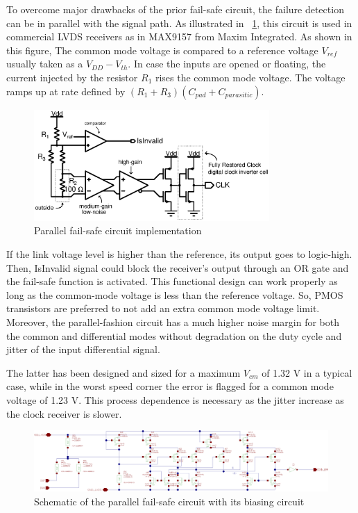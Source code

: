 To overcome major drawbacks of the prior fail-safe circuit, the failure detection can be in parallel with the signal path. As illustrated in \figurename~\ref{fig:parallel-fail-safe}, this circuit is used in commercial LVDS receivers as in MAX9157 from Maxim Integrated. As shown in this figure, The common mode voltage is compared to a reference voltage $V_{ref}$ usually taken as a $V_{DD}-V_{th}$. In case the inputs are opened or floating, the current injected by the resistor $R_1$ rises the common mode voltage. The voltage ramps up at rate defined by $(R_1+R_3)(C_{pad}+C_{parasitic})$.

\begin{figure}[htp]
    \centering
    \includegraphics[width=0.8\textwidth]{Chapter5/Figs/adc_chip/lvds-parallel-failsafe.ps}
    \caption{Parallel fail-safe circuit implementation}
    \label{fig:parallel-fail-safe}
\end{figure}

If the link voltage level is higher than the reference, its output goes to logic-high. Then, IsInvalid signal could block the receiver's output through an OR gate and the fail-safe function is activated. This functional design can work properly as long as the common-mode voltage is less than the reference voltage. So, PMOS transistors are preferred to not add an extra common mode voltage limit. Moreover, the parallel-fashion circuit has a much higher noise margin for both the common and differential modes without degradation on the duty cycle and jitter of the input differential signal.

The latter has been designed and sized for a maximum $V_{cm}$ of 1.32 V in a typical case, while in the worst speed corner the error is flagged for a common mode voltage of 1.23 V. This process dependence is necessary as the jitter increase as the clock receiver is slower.

\begin{figure}[htp]
    \centering
    \includegraphics[width=\textwidth]{Chapter5/Figs/adc_chip/lvds-failsafe.png}
    \caption{Schematic of the parallel fail-safe circuit with its biasing circuit}
    \label{}
\end{figure}

